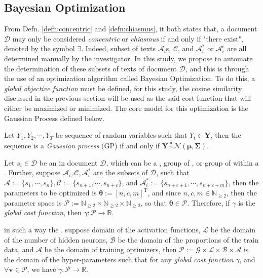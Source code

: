 \subsection{Bayesian Optimization}
From Defn. \ref{defn:concentric} and \ref{defn:chiasmus}, it both states that, a document $\mathscr{D}$ may only be considered \textit{concentric} or \textit{chiasmus} if and only if "there exist", denoted by the symbol $\exists$. Indeed, subset of texts $\mathscr{A}_i$s, $\mathscr{C}$, and $\mathscr{A}_i^{*}$ or $\mathscr{A}_i^{\text{c}}$ are all determined manually by the investigator. In this study, we propose to automate the determination of these subsets of texts of document $\mathscr{D}$, and this is through the use of an optimization algorithm called Bayesian Optimization. To do this, a \textit{global objective function} must be defined, for this study, the cosine similarity discussed in the previous section will be used as the said cost function that will either be maximized or minimized. The core model for this optimization is the Gaussian Process defined below.
\begin{defnx}\label{def:gp}
    Let $Y_1,Y_2,\cdots,Y_T$ be sequence of random variables such that $Y_t\in\mathbf{Y}$, then the sequence is a \textit{Gaussian process} (GP) if and only if $\mathbf{Y}\overset{\mathrm{iid}}{\sim}\mathcal{N}(\boldsymbol{\mu}, \boldsymbol{\Sigma})$.
\end{defnx}
\begin{defnx}\label{def:gcf}
    Let $s_i\in\mathscr{D}$ be an   in document $\mathscr{D}$, which can be a  , group of  , or group of   within a  . Further, suppose $\mathscr{A}_i,\mathscr{C},\mathscr{A}_i^{*}$ are the subsets of $\mathscr{D}$, such that $\mathscr{A}:=\{s_1,\cdots,s_n\}, \mathscr{C}:=\{s_{n+1},\cdots,s_{n+c}\}$, and $\mathscr{A}_i^{*}:=\{s_{n+c+1},\cdots,s_{n+c+m}\}$, then the parameters to be optimized is $\boldsymbol{\theta}:=[n,c,m]^{\text{T}}$, and since $n,c,m\in\mathbb{N}_{\geq 2}$, then the parameter space is $\mathscr{P}:=\mathbb{N}_{\geq 2}\times\mathbb{N}_{\geq 2}\times\mathbb{N}_{\geq 2}$, so that $\boldsymbol{\theta}\in\mathscr{P}$. Therefore, if $\gamma$ is the \textit{global cost function}, then $\gamma:\mathscr{P}\rightarrow\mathbb{R}$.
\end{defnx}
\begin{defnx}
    in such a way the . suppose   domain of the  activation functions, $\mathscr{L}$ be the domain of the number of hidden neurons, $\mathscr{B}$ be the domain of the proportions of the train data, and $\mathscr{A}$ be the domain of training optimizers, then $\mathscr{P}:=\mathscr{G}\times\mathscr{L}\times\mathscr{B}\times\mathscr{A}$ is the domain of the hyper-parameters such that for any \textit{global cost function} $\gamma$, and $\forall\mathbf{v}\in\mathscr{P}$, we have $\gamma:\mathscr{P}\rightarrow\mathbb{R}$.
\end{defnx}
